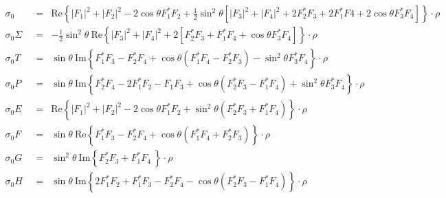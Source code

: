 \documentclass[a4paper,10pt]{article}
\def\cc{^*}
\def\Re{\mathrm{Re}}
\def\Im{\mathrm{Im}}
\begin{document}
\begin{displaymath}\label{frm_Obs}
\begin{array}{lll}
\sigma_0 & = & \Re \left\lbrace |F_1|^2 + |F_2|^2 - 2\cos\theta F_1\cc F_2  + \frac{1}{2}\sin^2\theta\left[ |F_3|^2 + |F_4|^2 + 2 F_2\cc  F_3    + 2 F_1\cc  F4 + 2\cos\theta F_3\cc F_4\right] \right\rbrace \cdot \rho\\
\sigma_0 \Sigma& = & - \frac{1}{2}\sin^2\theta\:\Re\left\lbrace|F_3|^2 + |F_4|^2 
                                               + 2\left[F_2\cc F_3 + F_1\cc F_4 
                                               + \cos\theta F_3\cc F_4\right]  
                                               \right\rbrace \cdot \rho\\
\sigma_0 T     & = & \sin\theta\:\Im \left\lbrace F_1\cc F_3 - F_2\cc F_4 
                                               + \cos\theta\left(F_1\cc F_4 - F_2\cc F_3\right)
                                               - \sin^2\theta F_3\cc F_4
                                               \right\rbrace \cdot \rho\\
\sigma_0 P     & = & \sin\theta\: \Im\left\lbrace F_2\cc F_4 - 2 F_1\cc F_2 - F_1 F_3
                                               + \cos\theta\left(F_2\cc F_3 - F_1\cc F_4\right) 
                                               + \sin^2\theta F_3\cc F_4
                                               \right\rbrace \cdot \rho\\
\sigma_0 E     & = & \Re\left\lbrace|F_1|^2 + |F_2|^2 - 2\cos\theta F_1\cc F_2
                                               +\sin^2\theta\left(F_2\cc F_3 + F_1\cc F_4\right)
                                               \right\rbrace \cdot \rho\\
\sigma_0 F     & = & \sin\theta \:\Re\left\lbrace F_1\cc F_3 - F_2\cc F_4 
                                               + \cos\theta\left(F_1\cc F_4 + F_2\cc F_3\right)
                                                 \right\rbrace \cdot \rho\\
\sigma_0 G     & = & \sin^2\theta \:\Im\left\lbrace F_2\cc F_3 + F_1\cc F_4\:
                                                \right\rbrace \cdot \rho\\
\sigma_0 H_{\phantom{z^\prime}}     & = & \sin\theta \:\Im \left\lbrace 2 F_1\cc F_2 + F_1\cc F_3 
                                               - F_2\cc F_4 -\cos\theta\left( F_2\cc F_3 - F_1\cc F_4 \right)
                                                 \right\rbrace \cdot \rho\\
\end{array}
\end{displaymath}
\end{document}
